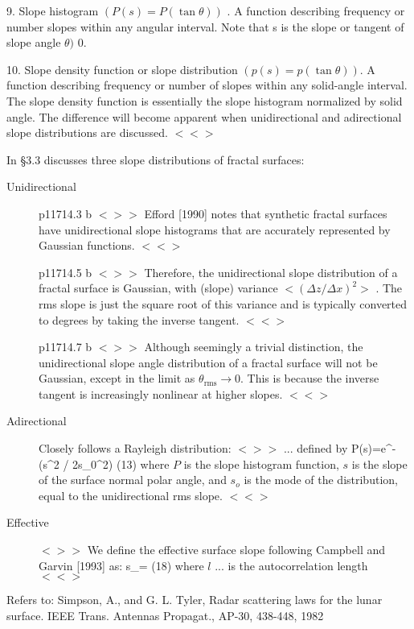\documentclass{article}
\newcommand{\qeq}{\hspace{25.mm}} %
\newcommand{\bq}{$ < \! > \!   \! >$ } %
\newcommand{\eq}{ $< \! \! < \! > $ } %
\begin{document}
9. Slope histogram $(P(s) = P( \tan \theta) )$ . A function describing frequency
or number slopes within any angular interval.  Note that s is the slope or
tangent of slope angle $ \theta) $ 0.

10. Slope density function or slope distribution $(p(s) = p( \tan \theta) )$.  A
function describing frequency or number of slopes within any solid-angle
interval. The slope density function is essentially the slope histogram
normalized by solid angle. The difference will become apparent when
unidirectional and adirectional slope distributions are discussed. \eq 


In \S 3.3 discusses three slope distributions of fractal surfaces:
\begin{description}  %
\item [Unidirectional]  
p11714.3 b \bq Efford [1990] notes that synthetic fractal surfaces have
unidirectional slope histograms that are accurately represented by Gaussian
functions. \eq

p11714.5 b \bq Therefore, the unidirectional slope distribution of a fractal
surface is Gaussian, with (slope) variance $<(\Delta z / \Delta x)^2>$ .  The
rms slope is just the square root of this variance and is typically converted
to degrees by taking the inverse tangent. \eq

p11714.7 b \bq Although seemingly a trivial distinction, the unidirectional
slope angle distribution of a fractal surface will not be Gaussian, except in
the limit as $\theta _\mathrm{rms} \rightarrow 0 $. This is because the inverse
tangent is increasingly nonlinear at higher slopes. \eq

 \item [Adirectional] Closely follows a Rayleigh distribution: 
\bq ... defined by \qb P(s)=e^{-(s^2 / 2s_0^2)} \qeq (13) \qe
where $P$ is the slope histogram function, $s$ is the slope of the surface
normal polar angle, and $s_o$ is the mode of the distribution, equal to the
unidirectional rms slope. \eq

 \item [Effective] \bq We define the effective surface slope following Campbell
and Garvin [1993] as:
\qb s_= \qeq (18) \qe
where $l$ ... is the autocorrelation length \eq

\end{description}

Refers to:  Simpson, A., and G. L. Tyler, Radar scattering laws for the lunar surface. IEEE Trans. Antennas Propagat., AP-30, 438-448, 1982
\end{document}

